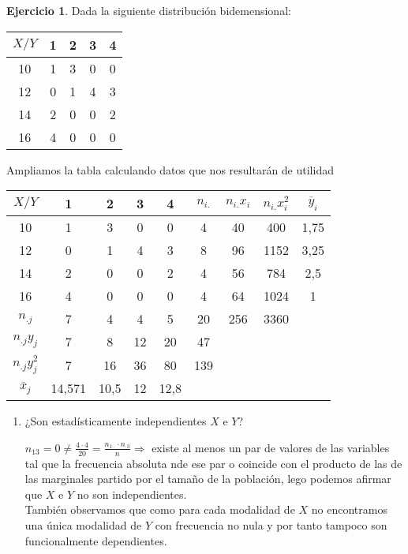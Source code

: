 \documentclass[a4paper, 12pt]{article}
\theoremstyle{definition}
\newtheorem{ej}{Ejercicio}
\begin{document}
\begin{ej}
Dada la siguiente distribución bidemensional:

\begin{center}
\begin{tabular}{c | c c c c}
	\(X/Y\) & 1 & 2 & 3 & 4 \\
	\hline
	10 & 1 & 3 & 0 & 0 \\
	12 & 0 & 1 & 4 & 3 \\
	14 & 2 & 0 & 0 & 2 \\
	16 & 4 & 0 & 0 & 0
\end{tabular}
\end{center}

Ampliamos la tabla calculando datos que nos resultarán de utilidad

\begin{center}
	\begin{tabular}{c | c c c c | c c c c}
	\(X/Y\) & 1 & 2 & 3 & 4 & \(n_{i.}\) & \(n_{i.} x_i\) & \(n_{i.} x_i^2\) & $\overline{y}_i$\\
	\hline
	10 & 1 & 3 & 0 & 0 & 4 & 40 & 400 & 1,75\\
	12 & 0 & 1 & 4 & 3 & 8 & 96 & 1152 & 3,25\\
	14 & 2 & 0 & 0 & 2 & 4 & 56 & 784 & 2,5\\
	16 & 4 & 0 & 0 & 0 & 4 & 64 & 1024 & 1\\
	\hline
	\(n_{.j}\) & 7 & 4 & 4 & 5 & 20 & 256 & 3360 & \\
	\(n_{.j} y_j\) & 7 & 8 & 12 & 20 & 47 \\
	\(n_{.j} y_j^2\) & 7 & 16 & 36 & 80 & 139 \\
	$\overline{x}_j$ & 14,571 & 10,5 & 12 & 12,8
	\end{tabular}
	\end{center}
\begin{enumerate}[label=\alph*)]
	\item ¿Son estadísticamente independientes \(X\) e \(Y\)?
	
	\(n_{13} =  0 \not= \frac{4\cdot4}{20} = \frac{n_{1\cdot}\cdot n_{\cdot3}}{n}\Longrightarrow\) existe al menos un par de valores de las variables tal que la frecuencia absoluta nde ese par o coincide con el producto de las de las marginales partido por el tamaño de la población, lego podemos afirmar que $X$ e $Y$ no son independientes.\\ También observamos que como para cada modalidad de \(X\) no encontramos una única modalidad de \(Y\) con frecuencia no nula y por tanto tampoco son funcionalmente dependientes.
	

\end{enumerate}
\end{ej}
\end{document}
